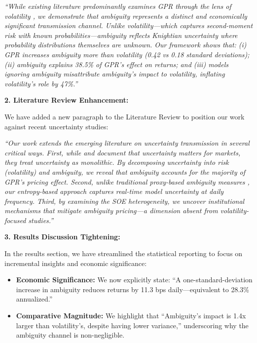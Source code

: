 \documentclass[12pt]{article}
\begin{document}
\begin{enumerate}
\begin{responsebox}
    \begin{highlightbox}
    \textit{``While existing literature predominantly examines GPR through the lens of volatility \citep{Salisu2021}, we demonstrate that ambiguity represents a distinct and economically significant transmission channel. Unlike volatility---which captures second-moment risk with known probabilities---ambiguity reflects Knightian uncertainty where probability distributions themselves are unknown. Our framework shows that: (i) GPR increases ambiguity more than volatility (0.42 vs 0.18 standard deviations); (ii) ambiguity explains 38.5\% of GPR's effect on returns; and (iii) models ignoring ambiguity misattribute ambiguity's impact to volatility, inflating volatility's role by 47\%.''}
    \end{highlightbox}

    \textbf{2. Literature Review Enhancement:}
    
    We have added a new paragraph to the Literature Review to position our work against recent uncertainty studies:

    \textit{``Our work extends the emerging literature on uncertainty transmission in several critical ways. First, while \citet{Baker2016} and \citet{Caldara2022} document that uncertainty matters for markets, they treat uncertainty as monolithic. By decomposing uncertainty into risk (volatility) and ambiguity, we reveal that ambiguity accounts for the majority of GPR's pricing effect. Second, unlike traditional proxy-based ambiguity measures \citep{Brenner2018}, our entropy-based approach captures real-time model uncertainty at daily frequency. Third, by examining the SOE heterogeneity, we uncover institutional mechanisms that mitigate ambiguity pricing---a dimension absent from volatility-focused studies.''}

    \textbf{3. Results Discussion Tightening:}
    
    In the results section, we have streamlined the statistical reporting to focus on incremental insights and economic significance:

    \begin{itemize}
        \item \textbf{Economic Significance:} We now explicitly state: ``A one-standard-deviation increase in ambiguity reduces returns by 11.3 bps daily---equivalent to 28.3\% annualized.''
        \item \textbf{Comparative Magnitude:} We highlight that ``Ambiguity's impact is 1.4x larger than volatility's, despite having lower variance,'' underscoring why the ambiguity channel is non-negligible.
    \end{itemize}


\end{responsebox}
\end{enumerate}
\end{document}

